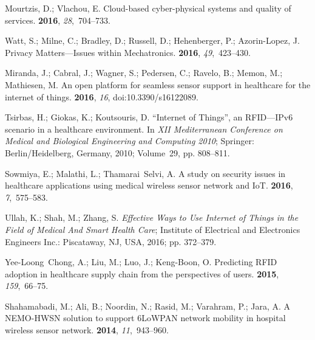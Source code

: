 \documentclass[symmetry,article,accept,moreauthors,pdftex10pt,a4paper]{mdpi}
\begin{document}
\begin{thebibliography}{999}
Mourtzis, D.; Vlachou, E.
\newblock Cloud-based cyber-physical systems and quality of services.
 {\bf 2016}, {\em 28},~704--733.

Watt, S.; Milne, C.; Bradley, D.; Russell, D.; Hehenberger, P.; Azorin-Lopez,
J.
\newblock Privacy Matters---Issues within Mechatronics.
 {\bf 2016}, {\em 49},~423--430.

Miranda, J.; Cabral, J.; Wagner, S.; Pedersen, C.; Ravelo, B.; Memon, M.;
Mathiesen, M.
\newblock An open platform for seamless sensor support in healthcare for the
internet of things.
 {\bf 2016}, {\em 16},  doi:10.3390/s16122089.

Tsirbas, H.; Giokas, K.; Koutsouris, D.
\newblock ``Internet of Things'', an RFID---IPv6 scenario in a healthcare
environment. In \emph{XII Mediterranean Conference on Medical and Biological Engineering and Computing 2010};
\newblock Springer: Berlin/Heidelberg, Germany, 2010; Volume~29, pp. 808--811.

Sowmiya, E.; Malathi, L.; Thamarai~Selvi, A.
\newblock A study on security issues in healthcare applications using medical
wireless sensor network and IoT.
 {\bf 2016}, {\em 7},~575--583.

Ullah, K.; Shah, M.; Zhang, S.
\newblock \emph{Effective Ways to Use Internet of Things in the Field of Medical And
	Smart Health Care};
\newblock Institute of Electrical and Electronics Engineers Inc.: Piscataway, NJ, USA, 2016; pp.
372--379.

Yee-Loong~Chong, A.; Liu, M.; Luo, J.; Keng-Boon, O.
\newblock Predicting RFID adoption in healthcare supply chain from the
perspectives of users.
 {\bf 2015}, {\em
	159},~66--75.

Shahamabadi, M.; Ali, B.; Noordin, N.; Rasid, M.; Varahram, P.; Jara, A.
\newblock A NEMO-HWSN solution to support 6LoWPAN network mobility in hospital
wireless sensor network.
 {\bf 2014}, {\em
	11},~943--960.


\end{thebibliography}
\end{document}
